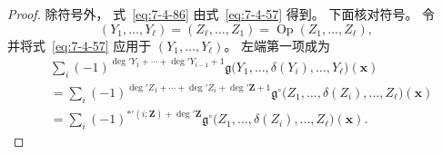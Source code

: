 \begin{proof}
除符号外，
式~\eqref{eq:7-4-86}
由式~\eqref{eq:7-4-57}
得到。
下面核对符号。
令
\[
(Y_1,\ldots,Y_\ell)
=(Z_\ell,\ldots,Z_1)
=\operatorname{Op}(Z_1,\ldots,Z_\ell),
\]
并将式~\eqref{eq:7-4-57}
应用于
$(Y_1,\ldots,Y_\ell)$。
左端第一项成为
\begin{equation}
\begin{aligned}
&\sum_i
(-1)^{
\deg'Y_1+\cdots+\deg'Y_{i-1}+1
}
\mathfrak g
\bigl(
Y_1,\ldots,\delta(Y_i),
\ldots,Y_\ell
\bigr)(\mathbf x)\\
&=
\sum_i
(-1)^{
\deg'Z_1+\cdots+\deg'Z_i
+\deg'\mathbf Z+1
}
\mathfrak g^{\circ}
\bigl(
Z_1,\ldots,\delta(Z_i),
\ldots,Z_\ell
\bigr)(\mathbf x)\\
&=
\sum_i
(-1)^{
*'(i;\mathbf Z)+\deg'\mathbf Z
}
\mathfrak g^{\circ}
\bigl(
Z_1,\ldots,\delta(Z_i),
\ldots,Z_\ell
\bigr)(\mathbf x).
\end{aligned}
\tag{7.4.87}\label{eq:7-4-87}
\end{equation}


\end{proof}
